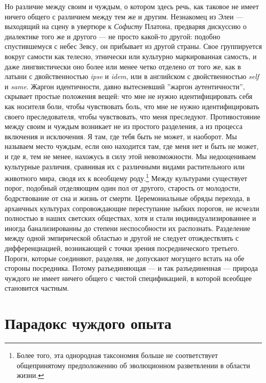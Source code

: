 \documentclass[12pt]{book}
\begin{document}
Но различие между своим и чуждым, о котором здесь речь, как таковое не имеет ничего общего с различием между тем же и другим. Незнакомец из Элеи --- выходящий на сцену в увертюре к \textit{Софисту} Платона, предваряя дискуссию о диалектике того же и другого --- не просто какой-то другой: подобно спустившемуся с небес Зевсу, он прибывает из другой страны. Свое группируется вокруг самости как телесно, этнически или культурно маркированная самость, и даже лингвистически оно более или менее четко отделено от того же, как в латыни с двойственностью \textit{ipse} и \textit{idem}, или в английском с двойственностью \textit{self} и \textit{same}. Жаргон идентичности, давно вытесневший ''жаргон аутентичности'', скрывает простые положения вещей: что мне не нужно идентифицировать себя как носителя боли, чтобы чувствовать боль, что мне не нужно идентифицировать своего преследователя, чтобы чувствовать, что меня преследуют. Противостояние между своим и чуждым возникает не из простого разделения, а из процесса включения и исключения. Я там, где тебя быть не может, и наоборот. Мы называем место чуждым, если оно находится там, где меня нет и быть не может, и где я, тем не менее, нахожусь в силу этой невозможности. Мы недооцениваем культурные различия, сравнивая их с различными видами растительного или животного мира, сводя их к всеобщему роду.\footnote{Более того, эта однородная таксономия больше не соответствует общепринятому предположению об эволюционном разветвлении в области жизни.} Между культурами существует порог, подобный отделяющим один пол от другого, старость от молодости, бодрствование от сна и жизнь от смерти. Церемониальные обряды перехода, в архаичных культурах сопровождающие переступание зыбких порогов, не исчезли полностью в наших светских обществах, хотя и стали индивидуализированнее и иногда банализированны до степени неспособности их распознать. Разделение между одной эмпирической областью и другой не следует отождествлять с дифференциацией, возникающей с точки зрения посреднического третьего. Пороги, которые соединяют, разделяя, не допускают могущего встать на обе стороны посредника. Потому разъединяющая --- и так разъединенная --- природа чуждого не имеет ничего общего с чистой спецификацией, в которой всеобщее становится частным.

\section{Парадокс чуждого опыта}
\end{document}
